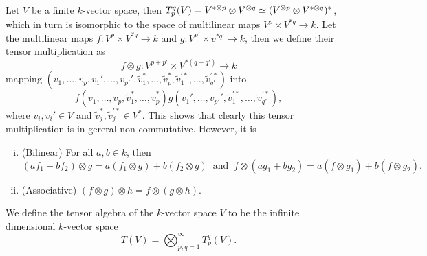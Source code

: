 \begin{definition}
  Let \(V\) be a finite \(k\)-vector space, then \(T_p^q(V) = V^{*\otimes p}
  \otimes V^{\otimes q} \simeq (V^{\otimes p} \otimes V^{* \otimes q})^*\), which
  in turn is isomorphic to the space of multilinear maps \(V^p \times V^{*q} \to
  k\). Let the multilinear maps \(f: V^p \times V^{*q} \to k\) and \(g:
  V^{p'} \times v^{*q'} \to k\), then we define their tensor multiplication as
  \[
    f \otimes g: V^{p + p'} \times V^{*(q + q')} \to k
  \]
  mapping \((v_1, \dots, v_p, v_1', \dots, v_{p'}', \widetilde v_1^*, \dots,
  \widetilde v_p^*, \widetilde v_1^{'*}, \dots, \widetilde v_{q'}^{'*})\) into
  \[
    f(v_1, \dots, v_p, \widetilde v_1^*, \dots, \widetilde v_p^*)
    g(v_1', \dots, v_{p'}', \widetilde v_1^{'*}, \dots, \widetilde v_{q'}^{'*}),
  \]
  where \(v_i, v_i' \in V\) and \(\widetilde v_j^*, \widetilde v_j^{'*} \in
  V^*\). This shows that clearly this tensor multiplication is in gereral
  non-commutative. However, it is
  \begin{enumerate}[(i).]
    \item (Bilinear) For all \(a, b \in k\), then
      \[
        (a f_1 + b f_2) \otimes g = a (f_1 \otimes g) + b (f_2 \otimes g)
        \ \text{ and }\
        f \otimes (a g_1 + b g_2) = a (f \otimes g_1) + b (f \otimes g_2).\]
    \item (Associative) \((f \otimes g) \otimes h = f \otimes (g \otimes h)\).
  \end{enumerate}
\end{definition}

\begin{definition}\label{def: tensor algebra vs}
  We define the tensor algebra of the \(k\)-vector space \(V\) to be the
  infinite dimensional \(k\)-vector space
  \[
    T(V) = \bigotimes_{p, q = 1}^\infty T_p^q(V).
  \]
\end{definition}
